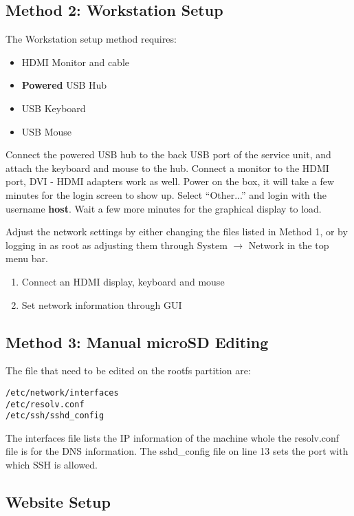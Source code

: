\documentclass[12pt, letterpaper, onecolumn, oneside]{article}
\begin{document}
\subsection*{Method 2: Workstation Setup}
The Workstation setup method requires:
\begin{itemize}
\item{HDMI Monitor and cable}
\item{{\bf Powered} USB Hub}
\item{USB Keyboard}
\item{USB Mouse}
\end{itemize}

Connect the powered USB hub to the back USB port of the service unit, and attach the keyboard and mouse to the hub.
Connect a monitor to the HDMI port, DVI - HDMI adapters work as well.
Power on the box, it will take a few minutes for the login screen to show up.
Select ``Other...'' and login with the username \textbf{host}.
Wait a few more minutes for the graphical display to load.

Adjust the network settings by either changing the files listed in Method 1, or by logging in as root as adjusting them through System $\rightarrow$ Network in the top menu bar.

\begin{enumerate}
\item{Connect an HDMI display, keyboard and mouse}
\item{Set network information through GUI}
\end{enumerate}


\subsection*{Method 3: Manual microSD Editing}

The file that need to be edited on the rootfs partition are:

\begin{verbatim}
/etc/network/interfaces
/etc/resolv.conf
/etc/ssh/sshd_config
\end{verbatim}

The interfaces file lists the IP information of the machine whole the resolv.conf file is for the DNS information.
The sshd\_config file on line 13 sets the port with which SSH is allowed.


\begin{centering}
\section*{Website Setup}
\end{centering}
\end{document}
